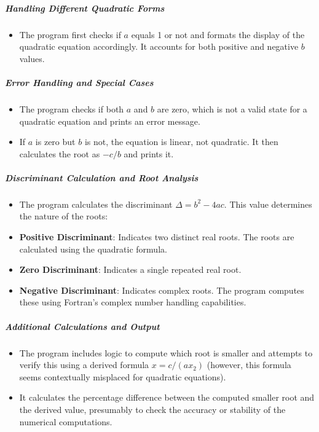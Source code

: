 \subparagraph{Handling Different Quadratic Forms}

\begin{itemize}
\item The program first checks if $a$ equals 1 or not and formats the display of the quadratic equation accordingly. It accounts for both positive and negative $b$ values.
\end{itemize}

\subparagraph{Error Handling and Special Cases}

\begin{itemize}
\item The program checks if both $a$ and $b$ are zero, which is not a valid state for a quadratic equation and prints an error message.
\item If $a$ is zero but $b$ is not, the equation is linear, not quadratic. It then calculates the root as $-c/b$ and prints it.
\end{itemize}

\subparagraph{Discriminant Calculation and Root Analysis}

\begin{itemize}
\item The program calculates the discriminant $\Delta = b^2 - 4ac$. This value determines the nature of the roots:
\item \textbf{Positive Discriminant}: Indicates two distinct real roots. The roots are calculated using the quadratic formula.
\item \textbf{Zero Discriminant}: Indicates a single repeated real root.
\item \textbf{Negative Discriminant}: Indicates complex roots. The program computes these using Fortran's complex number handling capabilities.
\end{itemize}

\subparagraph{Additional Calculations and Output}

\begin{itemize}
\item The program includes logic to compute which root is smaller and attempts to verify this using a derived formula $x = c/(ax_2)$ (however, this formula seems contextually misplaced for quadratic equations).
\item It calculates the percentage difference between the computed smaller root and the derived value, presumably to check the accuracy or stability of the numerical computations.
\end{itemize}

